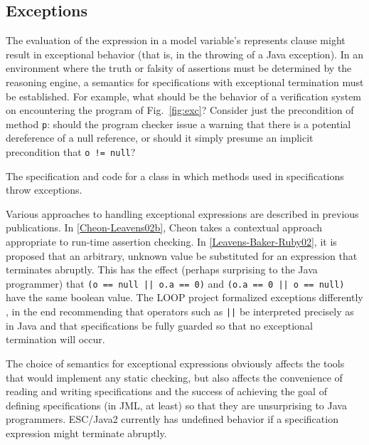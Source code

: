 \documentclass{sig-alternate}
\begin{document}

\subsection{Exceptions}

The evaluation of the expression in a model variable's represents clause might result in
exceptional behavior (that is, in the throwing of a Java exception).  In an environment
where the truth or falsity of assertions must be determined by the reasoning engine, a
semantics for specifications with exceptional termination must be established.  For example,
what should be the behavior of a verification system on encountering the program of 
Fig.~\ref{fig:exc}?  Consider just the precondition of method \texttt{p}: should the program 
checker issue a warning that there is a potential dereference of a null reference, or should it
simply presume an implicit precondition that \texttt{o != null}?

\begin{BFIGURE}

\caption{The specification and code for a class in which methods used in specifications throw exceptions.}
\label{fig:norep}
\end{BFIGURE}

Various approaches to handling exceptional expressions are described in previous 
publications.
In \ref{Cheon-Leavens02b}, Cheon takes a contextual approach appropriate to run-time 
assertion checking.   In \ref{Leavens-Baker-Ruby02}, it is proposed that 
an arbitrary, unknown value be substituted for an expression that terminates abruptly.
This has the effect (perhaps surprising to the Java programmer) that
\texttt{(o == null || o.a == 0)} and \texttt{(o.a == 0 || o == null)} have the same boolean value.
The LOOP project formalized exceptions differently \cite{BergPJ00a}, in the end recommending
that operators such as \texttt{||} be interpreted precisely as in Java and that specifications be
fully guarded so that no exceptional termination will occur.

The choice of semantics for exceptional expressions obviously affects the tools that would
implement any static checking, but also affects the convenience of reading and 
writing specifications and the success of achieving the goal of defining specifications (in JML, 
at least) so that they are unsurprising to Java programmers.  ESC/Java2 currently has
undefined behavior if a specification expression might terminate abruptly.
\end{document}
